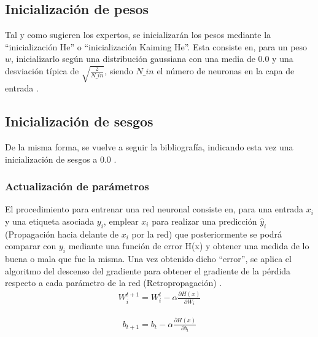 \subsection{Inicialización de pesos}
Tal y como sugieren los expertos, se inicializarán los pesos mediante la ``inicialización He'' o ``inicialización Kaiming He''. Esta consiste en, para un peso $w$, inicializarlo según una distribución gaussiana con una media de 0.0 y una desviación típica de $\sqrt{\frac{2}{N\_in}}$, siendo $N\_in$ el número de neuronas en la capa de entrada
\cite{ini_He} \cite{ini_He_2} \cite{ini_He_code} \cite{importancia_ReLU} \cite{importancia_ReLU_2}.

\subsection{Inicialización de sesgos}

De la misma forma, se vuelve a seguir la bibliografía, indicando esta vez una inicialización de sesgos a 0.0 \cite{ini_bias} \cite{ini_bias_2}.

\subsubsection{Actualización de parámetros}
El procedimiento para entrenar una red neuronal consiste en, para una entrada $x_i$ y una etiqueta asociada $y_i$, emplear $x_i$ para realizar una predicción $\hat{y}_i$ (Propagación hacia delante de $x_i$ por la red) que posteriormente se podrá comparar con $y_i$ mediante una función de error H(x) y obtener una medida de lo buena o mala que fue la misma. Una vez obtenido dicho ``error'', se aplica el algoritmo del descenso del gradiente para obtener el gradiente de la pérdida respecto a cada parámetro de la red (Retropropagación) \cite{Cross_entropy}. \\

\begin{gather}
	W^{t+1}_i = W^{t}_i - \alpha \frac{\partial H(x)}{\partial W_{i}} 
	\label{act_pesos}
\end{gather}

\begin{gather}
	b_{t+1} = b_{t} - \alpha \frac{\partial H(x)}{\partial b_{t}}
	\label{act_bias}
\end{gather}


